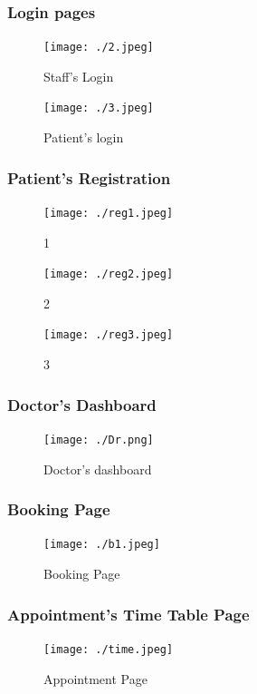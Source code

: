 \documentclass[]{article}
\begin{document}
\subsubsection{Login pages}
\FloatBarrier
\begin{figure}[h]
\centering
\texttt{[image: ./2.jpeg]}
\caption{Staff's Login}
\label{label1}
\end{figure}
\begin{figure}[h]
\centering
\texttt{[image: ./3.jpeg]}
\caption{Patient's login}
\label{label2}
\end{figure}
\FloatBarrier
\bigskip
\bigskip
\subsubsection{Patient's Registration}
\begin{figure}
 \begin{minipage}{.5\textwidth}
  \texttt{[image: ./reg1.jpeg]}
  \caption{1}
 \end{minipage}
 \begin{minipage}{.5\textwidth}
  \texttt{[image: ./reg2.jpeg]}
  \caption{2}
 \end{minipage}
  \begin{minipage}{.5\textwidth}
  \texttt{[image: ./reg3.jpeg]}
  \caption{3}
 \end{minipage}
\end{figure}
\FloatBarrier
\FloatBarrier
\subsubsection{Doctor's Dashboard}
\begin{figure}[h]
\centering
\texttt{[image: ./Dr.png]}
\caption{Doctor's dashboard}
\label{label1}
\end{figure}
\FloatBarrier
\newpage
\FloatBarrier
\subsubsection{Booking Page}
\begin{figure}[h]
\centering
\texttt{[image: ./b1.jpeg]}
\caption{Booking Page}
\label{label1}
\end{figure}
\FloatBarrier
\newpage
\FloatBarrier
\subsubsection{Appointment's Time Table Page}
\begin{figure}[h]
\centering
\texttt{[image: ./time.jpeg]}
\caption{Appointment Page}
\label{label1}
\end{figure}
\FloatBarrier
\end{document}
